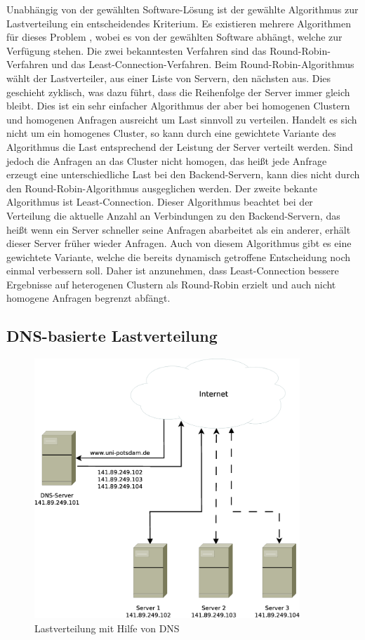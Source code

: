 \documentclass[a4paper, 12pt, BCOR10mm, DIV12, toc=bibliography, toc=listof, german]{scrbook}
\begin{document}
			Unabhängig von der gewählten Software-Lösung ist der gewählte Algorithmus zur Lastverteilung
			ein entscheidendes Kriterium. Es existieren mehrere Algorithmen für dieses Problem
			\cite{zinke2007}, wobei es von der gewählten Software abhängt, welche zur Verfügung stehen.
			Die zwei bekanntesten Verfahren sind das Round-Robin-Verfahren und das
			Least-Connection-Verfahren. Beim Round-Robin-Algorithmus wählt der Lastverteiler, aus einer
			Liste von Servern, den nächsten aus. Dies geschieht zyklisch, was dazu führt, dass die
			Reihenfolge der Server immer gleich bleibt. Dies ist ein sehr einfacher Algorithmus der aber bei
			homogenen Clustern und homogenen Anfragen ausreicht um Last sinnvoll zu verteilen. Handelt es
			sich nicht um ein homogenes Cluster, so kann durch eine gewichtete Variante des Algorithmus
			die Last entsprechend der Leistung der Server verteilt werden. Sind jedoch die Anfragen an das
			Cluster nicht homogen, das heißt jede Anfrage erzeugt eine unterschiedliche Last bei den
			Backend-Servern, kann dies nicht durch den Round-Robin-Algorithmus ausgeglichen werden. Der
			zweite bekante Algorithmus ist Least-Connection. Dieser Algorithmus beachtet bei der
			Verteilung die aktuelle Anzahl an Verbindungen zu den Backend-Servern, das heißt wenn ein
			Server schneller seine Anfragen abarbeitet als ein anderer, erhält dieser Server früher wieder
			Anfragen. Auch von diesem Algorithmus gibt es eine gewichtete Variante, welche die bereits
			dynamisch getroffene Entscheidung noch einmal verbessern soll. Daher ist anzunehmen, dass
			Least-Connection bessere Ergebnisse auf heterogenen Clustern als Round-Robin erzielt und auch
			nicht homogene Anfragen begrenzt abfängt.


			\subsection*{DNS-basierte Lastverteilung} %

			\begin{figure}
				\centering
				\includegraphics[width=10cm]{images/dns-loadbalancer}
				\caption{Lastverteilung mit Hilfe von DNS}
				\label{fig:lastverteilung-dns}
			\end{figure}
\end{document}
